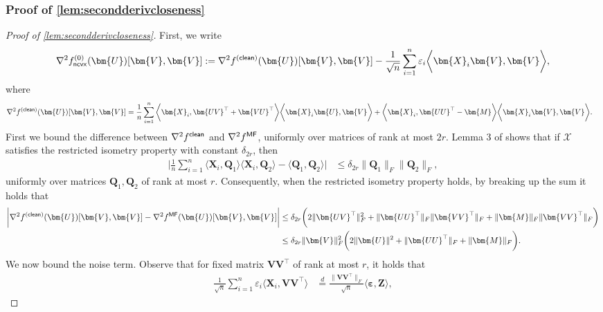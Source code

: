 \documentclass[10pt]{article}
\newcommand{\eps}{\ensuremath{\varepsilon}}
\renewcommand{\t}{^{\top}}
\theoremstyle{definition}
\begin{document}
\subsubsection{Proof of \cref{lem:secondderivcloseness}}
\label{sec:secondderivclosenessproof}
\begin{proof}[Proof of \cref{lem:secondderivcloseness}]
    First, we write 
    \begin{align}
        \nabla^2 f^{(0)}_{{\sf ncvx}}(\bm{U})[\bm{V}, \bm{V}] :=   \nabla^2 f^{({\sf clean})}(\bm{U})[\bm{V}, \bm{V}]
     - \frac{1}{\sqrt{n}} \sum_{i=1}^{n}\eps_i \bigg \langle \bm{X}_i \bm{V}, \bm{V} \bigg \rangle, 
    \end{align}
    where
    \begin{align}
     \nabla^2 f^{({\sf clean})}(\bm{U})[\bm{V}, \bm{V}]   &= \frac{1}{n} \sum_{i=1}^{n}  \bigg \langle \bm{X}_i, \bm{U V}\t + \bm{VU}\t  \bigg \rangle \bigg \langle \bm{X}_i \bm{U}, \bm{V} \bigg \rangle +  \bigg \langle \bm{X}_i , \bm{UU}\t - \bm{M} \bigg \rangle \bigg \langle \bm{X}_i \bm{V}, \bm{V} \bigg \rangle.
    \end{align}
First we bound the difference between $\nabla^2 f^{{\sf clean}}$ and $\nabla^2 f^{{\sf MF}}$, uniformly over matrices of rank at most $2r$.  Lemma 3 of \citet{chi_nonconvex_2019} shows that if $\mathcal{X}$ satisfies the restricted isometry property with constant $\delta_{2r}$, then 
\begin{align}
\bigg|    \frac{1}{n} \sum_{i=1}^{n} \langle \bm{X}_i, \bm{Q}_1 \rangle \langle \bm{X}_i, \bm{Q}_2 \rangle - \langle \bm{Q}_1, \bm{Q}_2 \rangle \bigg| &\leq \delta_{2r} \| \bm{Q}_1 \|_F \| \bm{Q}_2\|_F,
\end{align}
uniformly over matrices $\bm{Q}_1, \bm{Q}_2$ of rank at most $r$.  Consequently, when the restricted isometry property holds, by breaking up the sum it holds that
\begin{align}
    \bigg| \nabla^2 f^{{(\sf clean)}}(\bm{U})[\bm{V}, \bm{V}] - \nabla^2 f^{{\sf MF}}(\bm{U})[\bm{V}, \bm{V}] \bigg| &\leq \delta_{2r} \bigg( 2\| \bm{UV}\t \|_F^2 + \| \bm{UU}\t \|_F \| \bm{VV}\t \|_F + \| \bm{M} \|_F \| \bm{VV}\t \|_F \bigg) \\
    &\leq \delta_{2r} \| \bm{V}\|_F^2 \bigg( 2 \| \bm{U} \|^2 + \| \bm{UU}\t \|_F + \| \bm{M} \|_F \bigg).
\end{align}
We now bound the noise term.  Observe that for fixed matrix $\bm{VV}\t$ of rank at most $r$,   it holds that 
\begin{align}
    \frac{1}{\sqrt{n}} \sum_{i=1}^{n} \eps_i \bigg \langle \bm{X}_i ,\bm{V} \bm{V}\t \bigg \rangle &\overset{d}{=} \frac{ \| \bm{V} \bm{V}\t \|_F}{\sqrt{n}} \langle \bm{\eps}, \bm{Z} \rangle,

\end{align}
\end{proof}
\end{document}
